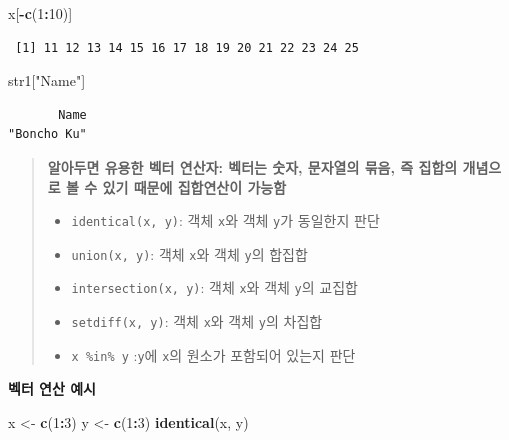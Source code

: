 \documentclass[11pt,a4paper]{book}
\newenvironment{Shaded}{\begin{snugshade}}{\end{snugshade}}
\newcommand{\KeywordTok}[1]{\textcolor[rgb]{0.13,0.29,0.53}{\textbf{#1}}}
\newcommand{\DecValTok}[1]{\textcolor[rgb]{0.00,0.00,0.81}{#1}}
\newcommand{\StringTok}[1]{\textcolor[rgb]{0.31,0.60,0.02}{#1}}
\newcommand{\OperatorTok}[1]{\textcolor[rgb]{0.81,0.36,0.00}{\textbf{#1}}}
\newcommand{\NormalTok}[1]{#1}
\theoremstyle{definition}
\theoremstyle{definition}
\theoremstyle{definition}
\theoremstyle{remark}
\begin{document}
\begin{Shaded}
\begin{Highlighting}[]
\NormalTok{x[}\OperatorTok{-}\KeywordTok{c}\NormalTok{(}\DecValTok{1}\OperatorTok{:}\DecValTok{10}\NormalTok{)]}
\end{Highlighting}
\end{Shaded}

\begin{verbatim}
 [1] 11 12 13 14 15 16 17 18 19 20 21 22 23 24 25
\end{verbatim}

\begin{Shaded}
\begin{Highlighting}[]
\NormalTok{str1[}\StringTok{"Name"}\NormalTok{]}
\end{Highlighting}
\end{Shaded}

\begin{verbatim}
       Name 
"Boncho Ku" 
\end{verbatim}

\normalsize

\begin{quote}
\colorbox{gray!10}{\begin{minipage}{15cm}
\textbf{알아두면 유용한 벡터 연산자: 벡터는 숫자, 문자열의 묶음, 즉 집합의 개념으로 볼 수 있기 때문에 집합연산이 가능함}
\begin{itemize}
  \item \texttt{identical(x, y)}: 객체 \texttt{x}와 객체 \texttt{y}가 동일한지 판단
  \item \texttt{union(x, y)}: 객체 \texttt{x}와 객체 \texttt{y}의 합집합
  \item \texttt{intersection(x, y)}: 객체 \texttt{x}와 객체 \texttt{y}의 교집합
  \item \texttt{setdiff(x, y)}: 객체 \texttt{x}와 객체 \texttt{y}의 차집합
  \item \texttt{x \%in\% y} :\texttt{y}에 \texttt{x}의 원소가 포함되어 있는지 판단
\end{itemize}
\end{minipage}}
\end{quote}

\vspace{0.5cm} \textbf{벡터 연산 예시}

\footnotesize

\begin{Shaded}
\begin{Highlighting}[]
\NormalTok{x <-}\StringTok{ }\KeywordTok{c}\NormalTok{(}\DecValTok{1}\OperatorTok{:}\DecValTok{3}\NormalTok{)}
\NormalTok{y <-}\StringTok{ }\KeywordTok{c}\NormalTok{(}\DecValTok{1}\OperatorTok{:}\DecValTok{3}\NormalTok{)}
\KeywordTok{identical}\NormalTok{(x, y)}
\end{Highlighting}
\end{Shaded}
\end{document}
